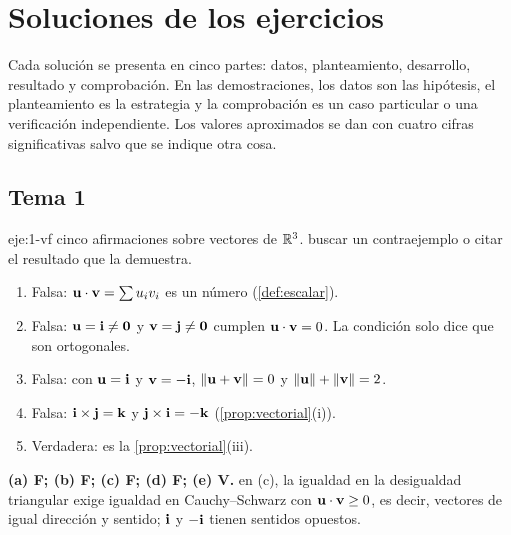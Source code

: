 \chapter{Soluciones de los ejercicios}
\label{ap:soluciones}

Cada solución se presenta en cinco partes: datos, planteamiento, desarrollo, resultado y comprobación. En las demostraciones, los datos son las hipótesis, el planteamiento es la estrategia y la comprobación es un caso particular o una verificación independiente. Los valores aproximados se dan con cuatro cifras significativas salvo que se indique otra cosa.

\section{Tema 1}

\begin{solucion}{eje:1-vf}
\datos cinco afirmaciones sobre vectores de $\mathbb{R}^3$.
\planteamiento buscar un contraejemplo o citar el resultado que la demuestra.
\pasos
\begin{enumerate}[label=(\alph*)]
  \item Falsa: $\mathbf{u}\cdot\mathbf{v}=\sum u_iv_i$ es un número (\cref{def:escalar}).
  \item Falsa: $\mathbf{u}=\mathbf{i}\neq\mathbf{0}$ y $\mathbf{v}=\mathbf{j}\neq\mathbf{0}$ cumplen $\mathbf{u}\cdot\mathbf{v}=0$. La condición solo dice que son ortogonales.
  \item Falsa: con $\mathbf{u}=\mathbf{i}$ y $\mathbf{v}=-\mathbf{i}$, $\lVert\mathbf{u}+\mathbf{v}\rVert=0$ y $\lVert\mathbf{u}\rVert+\lVert\mathbf{v}\rVert=2$.
  \item Falsa: $\mathbf{i}\times\mathbf{j}=\mathbf{k}$ y $\mathbf{j}\times\mathbf{i}=-\mathbf{k}$ (\cref{prop:vectorial}(i)).
  \item Verdadera: es la \cref{prop:vectorial}(iii).
\end{enumerate}
\resultado \textbf{(a) F; (b) F; (c) F; (d) F; (e) V.}
\comprobacion en (c), la igualdad en la desigualdad triangular exige igualdad en Cauchy--Schwarz con $\mathbf{u}\cdot\mathbf{v}\ge0$, es decir, vectores de igual dirección y sentido; $\mathbf{i}$ y $-\mathbf{i}$ tienen sentidos opuestos.
\end{solucion}

